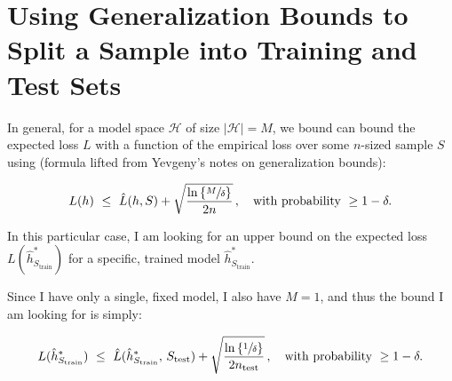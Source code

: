 \newcommand{\stest}{S_{\text{test}}}
\newcommand{\strain}{S_{\text{train}}}
\newcommand{\hhatstarstrain}{\hat{h}^{\ast}_{\strain}}
\section{Using Generalization Bounds to Split a Sample into Training and Test
Sets}

In general, for a model space $\mathcal H$ of size $\lvert \mathcal H \rvert =
M$, we bound can bound the expected loss $L$ with a function of the empirical
loss over some $n$-sized sample $S$ using (formula lifted from Yevgeny's notes
on generalization bounds):

\begin{align*}
  L(h) \ \leq\ \hat L(h, S) + \sqrt{\frac{\ln \left\{\sfrac{M}{\delta}\right\}}{2n}}\, ,
  \quad \text{with probability } \geq 1 - \delta.
\end{align*}

In this particular case, I am looking for an upper bound on the expected
loss $L(\hhatstarstrain)$ for a specific, trained model $\hhatstarstrain$. 

Since I have only a single, fixed model, I also have $M = 1$, and thus the bound
I am looking for is simply:

\begin{align*}
  L(\hhatstarstrain) \ \leq\ \hat L(\hhatstarstrain,\, \stest) +
  \sqrt{\frac{\lnb{\sfrac{1}{\delta}}}{2 n_{\text{test}}}} \, , \quad \text{with
  probability } \geq 1 - \delta.
\end{align*}



\sectend
\newpage

